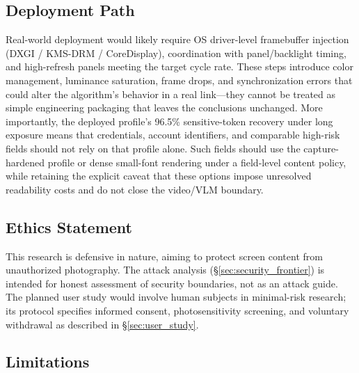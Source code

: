 \documentclass{ieeeaccess}
\begin{document}
\subsection{Deployment Path}

Real-world deployment would likely require OS driver-level framebuffer injection (DXGI / KMS-DRM / CoreDisplay), coordination with panel/backlight timing, and high-refresh panels meeting the target cycle rate. These steps introduce color management, luminance saturation, frame drops, and synchronization errors that could alter the algorithm's behavior in a real link---they cannot be treated as simple engineering packaging that leaves the conclusions unchanged. More importantly, the deployed profile's 96.5\% sensitive-token recovery under long exposure means that credentials, account identifiers, and comparable high-risk fields should not rely on that profile alone. Such fields should use the capture-hardened profile or dense small-font rendering under a field-level content policy, while retaining the explicit caveat that these options impose unresolved readability costs and do not close the video/VLM boundary.

\subsection{Ethics Statement}

This research is defensive in nature, aiming to protect screen content from unauthorized photography. The attack analysis (\S\ref{sec:security_frontier}) is intended for honest assessment of security boundaries, not as an attack guide. The planned user study would involve human subjects in minimal-risk research; its protocol specifies informed consent, photosensitivity screening, and voluntary withdrawal as described in \S\ref{sec:user_study}.

\subsection{Limitations}
\end{document}
